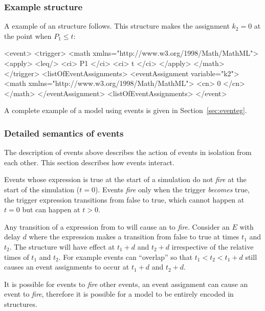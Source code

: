 \subsubsection{Example  structure}

A example of an \Event structure follows.  This structure makes the
assignment $k_2 = 0$ at the point when $P_1 \leq t$:

\begin{example}
<event>
    <trigger>
        <math xmlns="http://www.w3.org/1998/Math/MathML">
            <apply>
                <leq/>
                <ci> P1 </ci>
                <ci> t </ci>
            </apply>
        </math>
    </trigger>
    <listOfEventAssignments>
        <eventAssignment variable="k2">
            <math xmlns="http://www.w3.org/1998/Math/MathML">
                <cn> 0 </cn>
            </math>
        </eventAssignment>
    <listOfEventAssignments>
</event>
\end{example}

A complete example of a model using events is given in
Section~\ref{sec:eventeg}.


\subsubsection{Detailed semantics of events}
\label{sec:events-semantics}

The description of events above describes the action of events in
isolation from each other.  This section describes how events
interact.

Events whose  expression is true at the start of a
simulation do not \emph{fire} at the start of the simulation ($t =
0$).  Events \emph{fire} only when the trigger \emph{becomes}
true, \ie the trigger expression transitions from false to true,
which cannot happen at $t = 0$ but can happen at $t > 0$.

Any transition of a  expression from  to
 will cause an  to \emph{fire}.  Consider
an  $E$ with delay $d$ where the 
expression makes a transition from false to true at times $t_1$
and $t_2$.  The \EventAssignment structure will have effect at
$t_1+d$ and $t_2+d$ irrespective of the relative times of $t_1$
and $t_2$. For example events can ``overlap'' so that $t_1 < t_2 <
t_1+d$ still causes an event assignments to occur at $t_1+d$ and
$t_2+d$.

It is possible for events to \emph{fire} other events, \ie an
event assignment can cause an event to \emph{fire}, therefore it
is possible for a model to be entirely encoded in \Event
structures.

